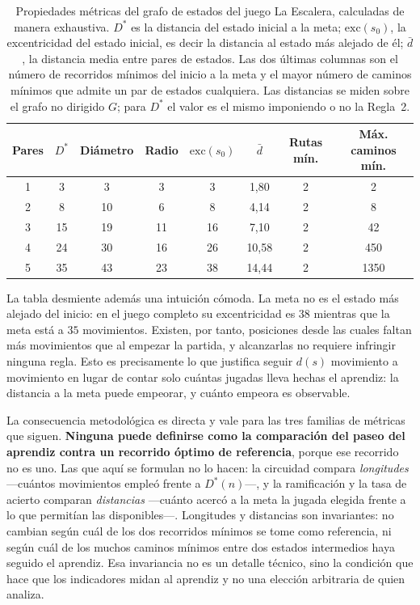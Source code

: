 \documentclass{book}
\begin{document}
\begin{table}[H]
\centering
\caption{Propiedades métricas del grafo de estados del juego La
Escalera, calculadas de manera exhaustiva. $D^{*}$ es la distancia del
estado inicial a la meta; $\mathrm{exc}(s_0)$, la excentricidad del
estado inicial, es decir la distancia al estado más alejado de él;
$\bar{d}$, la distancia media entre pares de estados. Las dos últimas
columnas son el número de recorridos mínimos del inicio a la meta y el
mayor número de caminos mínimos que admite un par de estados
cualquiera. Las distancias se miden sobre el grafo no dirigido $G$; para
$D^{*}$ el valor es el mismo imponiendo o no la Regla~2.}
\label{tab:propiedades_metricas}
\renewcommand{\arraystretch}{1.25}
\begin{tabular}{|c|c|c|c|c|c|c|c|}
\hline
\textbf{Pares} & \textbf{$D^{*}$} & \textbf{Diámetro} & \textbf{Radio} &
\textbf{$\mathrm{exc}(s_0)$} & \textbf{$\bar{d}$} & \textbf{Rutas mín.} &
\textbf{Máx. caminos mín.} \\
\hline
1 & 3  & 3  & 3  & 3  & 1,80  & 2 & 2 \\
2 & 8  & 10 & 6  & 8  & 4,14  & 2 & 8 \\
3 & 15 & 19 & 11 & 16 & 7,10  & 2 & 42 \\
4 & 24 & 30 & 16 & 26 & 10,58 & 2 & 450 \\
5 & 35 & 43 & 23 & 38 & 14,44 & 2 & 1350 \\
\hline
\end{tabular}
\end{table}

La tabla desmiente además una intuición cómoda. La meta no es el estado
más alejado del inicio: en el juego completo su excentricidad es $38$
mientras que la meta está a $35$ movimientos. Existen, por tanto,
posiciones desde las cuales faltan más movimientos que al empezar la
partida, y alcanzarlas no requiere infringir ninguna regla. Esto es
precisamente lo que justifica seguir $d(s)$ movimiento a movimiento en
lugar de contar solo cuántas jugadas lleva hechas el aprendiz: la
distancia a la meta puede empeorar, y cuánto empeora es observable.

La consecuencia metodológica es directa y vale para las tres familias
de métricas que siguen. \textbf{Ninguna puede definirse como la
comparación del paseo del aprendiz contra un recorrido óptimo de
referencia}, porque ese recorrido no es uno. Las que aquí se formulan no
lo hacen: la circuidad compara \textit{longitudes} —cuántos movimientos
empleó frente a $D^{*}(n)$—, y la ramificación y la tasa de acierto
comparan \textit{distancias} —cuánto acercó a la meta la jugada elegida
frente a lo que permitían las disponibles—. Longitudes y distancias son
invariantes: no cambian según cuál de los dos recorridos mínimos se tome
como referencia, ni según cuál de los muchos caminos mínimos entre dos
estados intermedios haya seguido el aprendiz. Esa invariancia no es un
detalle técnico, sino la condición que hace que los indicadores midan al
aprendiz y no una elección arbitraria de quien analiza.
\end{document}
